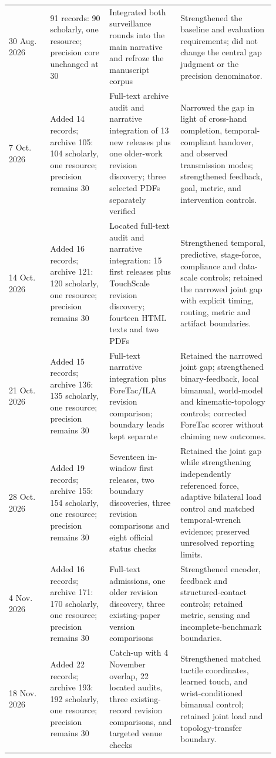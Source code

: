 \begin{longtable}{P{0.14\linewidth} P{0.20\linewidth} P{0.24\linewidth} P{0.32\linewidth}}
30 Aug. 2026 & 91 records: 90 scholarly, one resource; precision core unchanged at 30 & Integrated both surveillance rounds into the main narrative and refroze the manuscript corpus & Strengthened the baseline and evaluation requirements; did not change the central gap judgment or the precision denominator. \\
7 Oct. 2026 & Added 14 records; archive 105: 104 scholarly, one resource; precision remains 30 & Full-text archive audit and narrative integration of 13 new releases plus one older-work revision discovery; three selected PDFs separately verified & Narrowed the gap in light of cross-hand completion, temporal-compliant handover, and observed transmission modes; strengthened feedback, goal, metric, and intervention controls. \\
14 Oct. 2026 & Added 16 records; archive 121: 120 scholarly, one resource; precision remains 30 & Located full-text audit and narrative integration: 15 first releases plus TouchScale revision discovery; fourteen HTML texts and two PDFs & Strengthened temporal, predictive, stage-force, compliance and data-scale controls; retained the narrowed joint gap with explicit timing, routing, metric and artifact boundaries. \\
21 Oct. 2026 & Added 15 records; archive 136: 135 scholarly, one resource; precision remains 30 & Full-text narrative integration plus ForeTac/ILA revision comparison; boundary leads kept separate & Retained the narrowed joint gap; strengthened binary-feedback, local bimanual, world-model and kinematic-topology controls; corrected ForeTac scorer without claiming new outcomes. \\
28 Oct. 2026 & Added 19 records; archive 155: 154 scholarly, one resource; precision remains 30 & Seventeen in-window first releases, two boundary discoveries, three revision comparisons and eight official status checks & Retained the joint gap while strengthening independently referenced force, adaptive bilateral load control and matched temporal-wrench evidence; preserved unresolved reporting limits. \\
4 Nov. 2026 & Added 16 records; archive 171: 170 scholarly, one resource; precision remains 30 & Full-text admissions, one older revision discovery, three existing-paper version comparisons & Strengthened encoder, feedback and structured-contact controls; retained metric, sensing and incomplete-benchmark boundaries. \\
18 Nov. 2026 & Added 22 records; archive 193: 192 scholarly, one resource; precision remains 30 & Catch-up with 4 November overlap, 22 located audits, three existing-record revision comparisons, and targeted venue checks & Strengthened matched tactile coordinates, learned touch, and wrist-conditioned bimanual control; retained joint load and topology-transfer boundary. \\
\bottomrule
\end{longtable}

